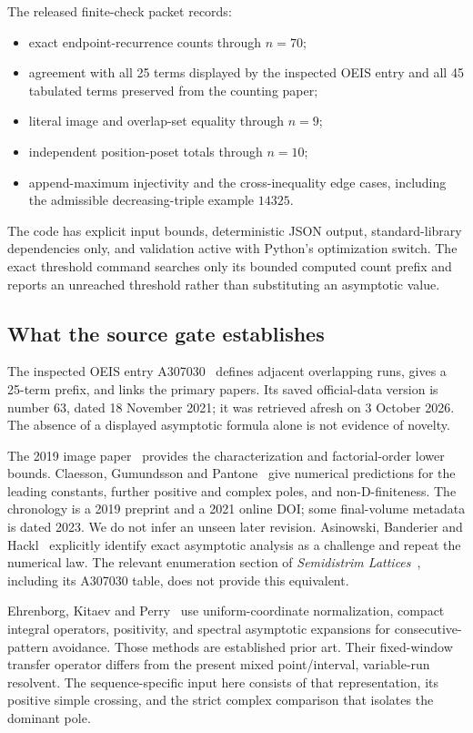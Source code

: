 \documentclass[11pt,letterpaper]{article}
\numberwithin{equation}{section}
\theoremstyle{remark}\newtheorem{remark}[theorem]{Remark}
\begin{document}
The released finite-check packet records:
\begin{itemize}
\item exact endpoint-recurrence counts through $n=70$;
\item agreement with all 25 terms displayed by the inspected OEIS
entry and all 45 tabulated terms preserved from the counting paper;
\item literal image and overlap-set equality through $n=9$;
\item independent position-poset totals through $n=10$;
\item append-maximum injectivity and the cross-inequality edge cases,
including the admissible decreasing-triple example $14325$.
\end{itemize}
The code has explicit input bounds, deterministic JSON output,
standard-library dependencies only, and validation active with
Python's optimization switch. The exact threshold command searches
only its bounded computed count prefix and reports an unreached
threshold rather than substituting an asymptotic value.

\subsection{What the source gate establishes}
The inspected OEIS entry A307030~\cite{oeisA307030} defines adjacent
overlapping runs, gives a 25-term prefix, and links the primary
papers. Its saved official-data version is number 63, dated
18 November 2021; it was retrieved afresh on 3 October 2026.
The absence of a displayed asymptotic formula alone is not evidence
of novelty.

The 2019 image paper~\cite{abbhl} provides the characterization and
factorial-order lower bounds. Claesson, Gu\dh mundsson and
Pantone~\cite[Section 3.3]{cgp} give numerical predictions for the
leading constants, further positive and complex poles, and
non-D-finiteness. The chronology is a 2019 preprint and a 2021 online
DOI; some final-volume metadata is dated 2023. We do not infer an
unseen later revision. Asinowski, Banderier and
Hackl~\cite[Section 2.4]{abh} explicitly identify exact asymptotic
analysis as a challenge and repeat the numerical law. The relevant
enumeration section of \emph{Semidistrim Lattices}~\cite{dw}, including
its A307030 table, does not provide this equivalent.

Ehrenborg, Kitaev and Perry~\cite{ekp} use uniform-coordinate
normalization, compact integral operators, positivity, and spectral
asymptotic expansions for consecutive-pattern avoidance. Those
methods are established prior art. Their fixed-window transfer
operator differs from the present mixed point/interval,
variable-run resolvent. The sequence-specific input here consists
of that representation, its positive simple crossing, and the
strict complex comparison that isolates the dominant pole.
\end{document}
